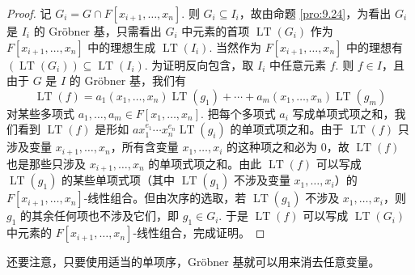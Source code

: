 \begin{proof}
记 \(G_i = G \cap F[x_{i+1}, \ldots, x_n]\). 则 \(G_i \subseteq I_i\)，故由命题 \ref{pro:9.24}，为看出 \(G_i\) 是 \(I_i\) 的 Gröbner 基，只需看出 \(G_i\) 中元素的首项 \(\operatorname{LT}(G_i)\) 作为 \(F[x_{i+1}, \ldots, x_n]\) 中的理想生成 \(\operatorname{LT}(I_i)\). 当然作为 \(F[x_{i+1}, \ldots, x_n]\) 中的理想有 \((\operatorname{LT}(G_i)) \subseteq \operatorname{LT}(I_i)\). 为证明反向包含，取 \(I_i\) 中任意元素 \(f\). 则 \(f \in I\)，且由于 \(G\) 是 \(I\) 的 Gröbner 基，我们有
\[
\operatorname{LT}(f) = a_1(x_1, \ldots, x_n)\operatorname{LT}(g_1) + \cdots + a_m(x_1, \ldots, x_n)\operatorname{LT}(g_m)
\]
对某些多项式 \(a_1, \ldots, a_m \in F[x_1, \ldots, x_n]\). 把每个多项式 \(a_i\) 写成单项式项之和，我们看到 \(\operatorname{LT}(f)\) 是形如 \(ax_1^{e_1}\cdots x_n^{e_n}\operatorname{LT}(g_i)\) 的单项式项之和。由于 \(\operatorname{LT}(f)\) 只涉及变量 \(x_{i+1}, \ldots, x_n\)，所有含变量 \(x_1, \ldots, x_i\) 的这种项之和必为 0，故 \(\operatorname{LT}(f)\) 也是那些只涉及 \(x_{i+1}, \ldots, x_n\) 的单项式项之和。由此 \(\operatorname{LT}(f)\) 可以写成 \(\operatorname{LT}(g_1)\) 的某些单项式项（其中 \(\operatorname{LT}(g_1)\) 不涉及变量 \(x_1, \ldots, x_i\)）的 \(F[x_{i+1}, \ldots, x_n]\)-线性组合。但由次序的选取，若 \(\operatorname{LT}(g_1)\) 不涉及 \(x_1, \ldots, x_i\)，则 \(g_1\) 的其余任何项也不涉及它们，即 \(g_1 \in G_i\). 于是 \(\operatorname{LT}(f)\) 可以写成 \(\operatorname{LT}(G_i)\) 中元素的 \(F[x_{i+1}, \ldots, x_n]\)-线性组合，完成证明。
\end{proof}

还要注意，只要使用适当的单项序，Gröbner 基就可以用来消去任意变量。

